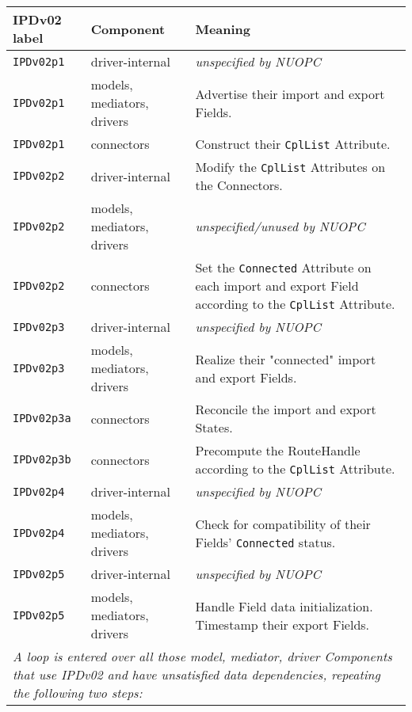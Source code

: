 \vspace*{3ex}
\begin{longtable}[h]{|p{}|p{}|p{}|}
     \hline\hline
     {\bf IPDv02 label} & {\bf Component} & {\bf Meaning}\\
     \hline\hline
     {\tt IPDv02p1} & driver-internal             & {\em unspecified by NUOPC}\\ \hline
     {\tt IPDv02p1} & models, mediators, drivers  & Advertise their import and export Fields.\\ \hline
     {\tt IPDv02p1} & connectors                  & Construct their {\tt CplList} Attribute.\\ \hline
     {\tt IPDv02p2} & driver-internal             & Modify the {\tt CplList} Attributes on the Connectors.\\ \hline
     {\tt IPDv02p2} & models, mediators, drivers  & {\em unspecified/unused by NUOPC}\\ \hline
     {\tt IPDv02p2} & connectors                  & Set the {\tt Connected} Attribute on each import and export Field according to the {\tt CplList} Attribute.\\ \hline
     {\tt IPDv02p3} & driver-internal             & {\em unspecified by NUOPC}\\ \hline
     {\tt IPDv02p3} & models, mediators, drivers  & Realize their "connected" import and export Fields.\\ \hline
     {\tt IPDv02p3a}& connectors                  & Reconcile the import and export States.\\ \hline
     {\tt IPDv02p3b}& connectors                  & Precompute the RouteHandle according to the {\tt CplList} Attribute.\\ \hline
     {\tt IPDv02p4} & driver-internal             & {\em unspecified by NUOPC}\\ \hline
     {\tt IPDv02p4} & models, mediators, drivers  & Check for compatibility of their Fields' {\tt Connected} status.\\ \hline
     {\tt IPDv02p5} & driver-internal             & {\em unspecified by NUOPC}\\ \hline
     {\tt IPDv02p5} & models, mediators, drivers  & Handle Field data initialization. Timestamp their export Fields.\\ \hline
     \multicolumn{3}{|p{13.5cm}|}{\it A loop is entered over all those model, mediator, driver Components that use IPDv02 and have
     unsatisfied data dependencies, repeating the following two steps:}\\ \hline

\end{longtable}
